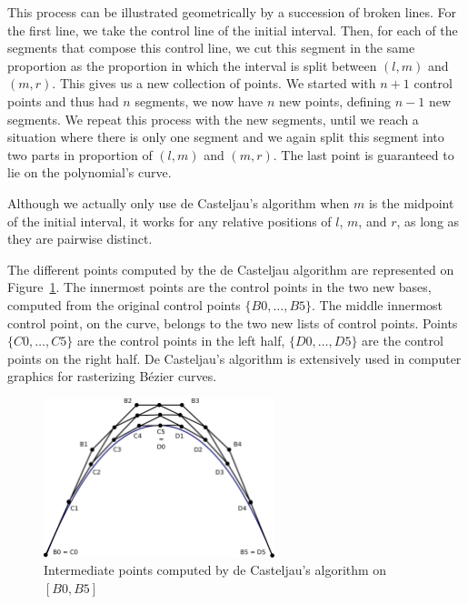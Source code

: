 \documentclass{mscs}
\begin{document}
This process can be illustrated geometrically by a succession of broken
lines.
For the first line, we take the control line of the initial
interval.  Then, for each of the segments that compose this control line,
we cut this segment in the same proportion as the proportion in which
the interval is split between \((l,m)\) and \((m,r)\).  This gives us
a new collection of points.  We started with \(n + 1\) control points and
thus had \(n\) segments, we now have \(n\) new points, defining \(n-1\)
new segments.  We repeat this process with the new segments, until we reach
a situation where there is only one segment and we again split this
segment into two parts in proportion of \((l,m)\) and \((m,r)\).  The
last point is guaranteed to lie on the polynomial's curve.

Although we actually only use de Casteljau's algorithm when \(m\) is
the midpoint of the initial interval, it works for any relative
positions of \(l\), \(m\), and \(r\), as long as they are pairwise distinct.

The different points computed by the de Casteljau algorithm are
represented on Figure~\ref{dichobern}. The innermost points are the
control points in the two new bases, computed from the original control
points $\{B0, \dots, B5\}$.
The middle innermost control point, on the curve, belongs to the two
new lists of control points. Points $\{C0, \dots, C5\}$ are the
control points in the left half, $\{D0, \dots, D5\}$ are the control
points on the right half.
De Casteljau's algorithm is extensively used in computer  graphics for
rasterizing B{\'e}zier curves.

\begin{figure}[h]
\begin{center}
\includegraphics[width=0.6\textwidth]{dicho_bern.pdf}
\caption{\label{dichobern}Intermediate points computed by de Casteljau's
 algorithm on $[B0, B5]$}
\end{center}
\end{figure}
\end{document}
